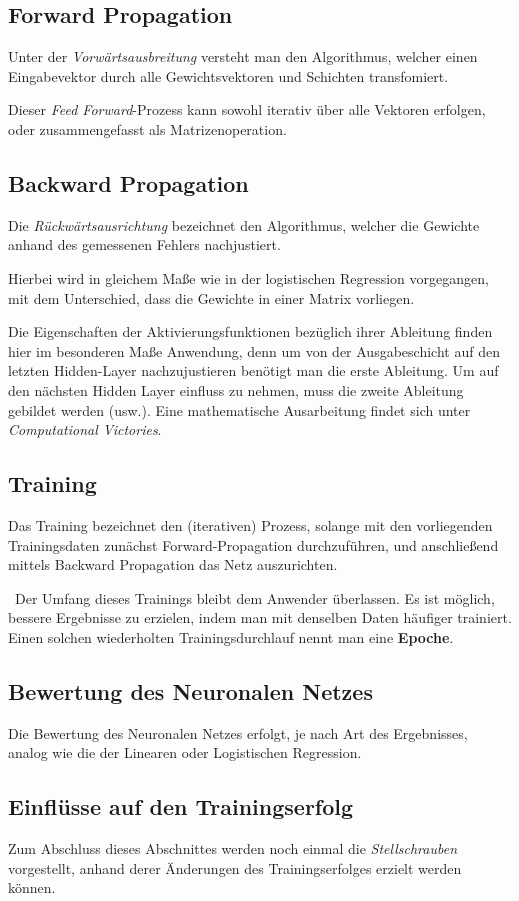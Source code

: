 \subsection{Forward Propagation}
Unter der \textit{Vorwärtsausbreitung} versteht man den Algorithmus, welcher einen Eingabevektor durch alle Gewichtsvektoren und Schichten transfomiert. 

Dieser \textit{Feed Forward}-Prozess kann sowohl iterativ über alle Vektoren erfolgen, oder zusammengefasst als Matrizenoperation.
\subsection{Backward Propagation}
Die \textit{Rückwärtsausrichtung} bezeichnet den Algorithmus, welcher die Gewichte anhand des gemessenen Fehlers nachjustiert. 

Hierbei wird in gleichem Maße wie in der logistischen Regression vorgegangen, mit dem Unterschied, dass die Gewichte in einer Matrix vorliegen. 

Die Eigenschaften der Aktivierungsfunktionen bezüglich ihrer Ableitung finden hier im besonderen Maße Anwendung, denn um von der Ausgabeschicht auf den letzten Hidden-Layer nachzujustieren benötigt man die erste Ableitung. Um auf den nächsten Hidden Layer einfluss zu nehmen, muss die zweite Ableitung gebildet werden (usw.). Eine mathematische Ausarbeitung findet sich unter \cite{colah} \textit{Computational Victories}.
\subsection{Training}
Das Training bezeichnet den (iterativen) Prozess, solange mit den vorliegenden Trainingsdaten zunächst Forward-Propagation durchzuführen, und anschließend mittels Backward Propagation das Netz auszurichten. 

~\newline Der Umfang dieses Trainings bleibt dem Anwender überlassen. Es ist möglich, bessere Ergebnisse zu erzielen, indem man mit denselben Daten häufiger trainiert. Einen solchen wiederholten Trainingsdurchlauf nennt man eine \textbf{Epoche}. 
\subsection{Bewertung des Neuronalen Netzes}
Die Bewertung des Neuronalen Netzes erfolgt, je nach Art des Ergebnisses, analog wie die der Linearen oder Logistischen Regression. 
\subsection{Einflüsse auf den Trainingserfolg}
Zum Abschluss dieses Abschnittes werden noch einmal die \textit{Stellschrauben} vorgestellt, anhand derer Änderungen des Trainingserfolges erzielt werden können. 

